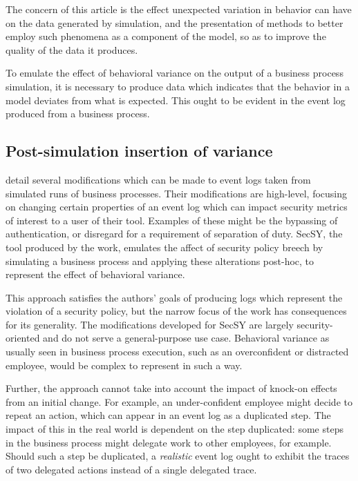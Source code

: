 \documentclass[draft,12pt]{llncs}  %
\begin{document}
The concern of this article is the effect unexpected variation in behavior can
have on the data generated by simulation, and the presentation of methods to
better employ such phenomena as a component of the model, so as to improve the
quality of the data it produces.
\par

To emulate the effect of behavioral variance on the output of a business process
simulation, it is necessary to produce data which indicates that the behavior in
a model deviates from what is expected. This ought to be evident in the event
log produced from a business process.
\par

\subsection{Post-simulation insertion of variance}
\cite{accorsi2013secsy} detail several modifications which can be made to event
logs taken from simulated runs of business processes. Their modifications are
high-level, focusing on changing certain properties of an event log which can
impact security metrics of interest to a user of their tool. Examples of these 
might be the bypassing of authentication, or disregard for a requirement of
separation of duty. SecSY, the tool produced by the work, emulates the affect of
security policy breech by simulating a business process and applying these
alterations post-hoc, to represent the effect of behavioral variance.
\par

This approach satisfies the authors' goals of producing logs which represent the
violation of a security policy, but the narrow focus of the work has
consequences for its generality. The modifications developed for SecSY are
largely security-oriented and do not serve a general-purpose use case.
Behavioral variance as usually seen in business process execution, such as an
overconfident or distracted employee, would be complex to represent in such a
way.
\par

Further, the approach cannot take into account the impact of knock-on
effects from an initial change. For example, an under-confident employee might
decide to repeat an action, which can appear in an event log as a duplicated
step. The impact of this in the real world is dependent on the step duplicated:
some steps in the business process might delegate work to other employees, for
example. Should such a step be duplicated, a \emph{realistic} event log ought to
exhibit the traces of two delegated actions instead of a single delegated trace.
\par
\end{document}
